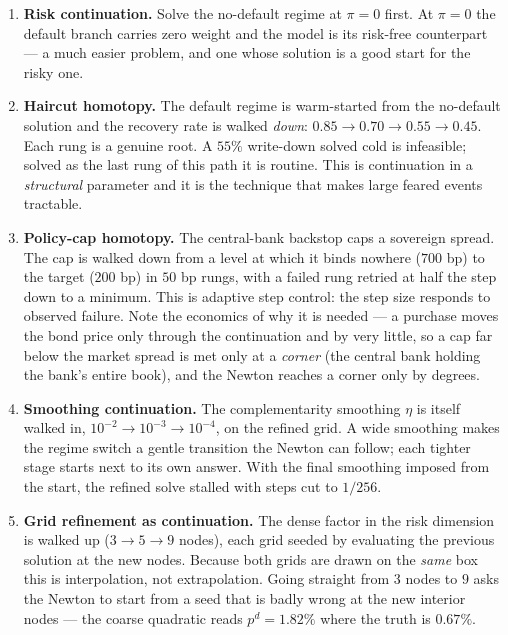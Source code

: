 \documentclass[10pt,a4paper]{article}
\theoremstyle{definition}
\theoremstyle{plain}
\theoremstyle{remark}
\begin{document}
\begin{enumerate}
\item \textbf{Risk continuation.} Solve the no-default regime at $\pi = 0$ first. At $\pi=0$
the default branch carries zero weight and the model is its risk-free counterpart --- a much
easier problem, and one whose solution is a good start for the risky one.

\item \textbf{Haircut homotopy.} The default regime is warm-started from the no-default
solution and the recovery rate is walked \emph{down}:
$0.85 \to 0.70 \to 0.55 \to 0.45$. Each rung is a genuine root. A $55\%$ write-down solved
cold is infeasible; solved as the last rung of this path it is routine. This is continuation in
a \emph{structural} parameter and it is the technique that makes large feared events tractable.

\item \textbf{Policy-cap homotopy.} The central-bank backstop caps a sovereign spread. The
cap is walked down from a level at which it binds nowhere ($700$ bp) to the target ($200$ bp)
in $50$ bp rungs, with a failed rung retried at half the step down to a minimum. This is
adaptive step control: the step size responds to observed failure. Note the economics of why
it is needed --- a purchase moves the bond price only through the continuation and by very
little, so a cap far below the market spread is met only at a \emph{corner} (the central bank
holding the bank's entire book), and the Newton reaches a corner only by degrees.

\item \textbf{Smoothing continuation.} The complementarity smoothing $\eta$ is itself walked
in, $10^{-2}\to10^{-3}\to10^{-4}$, on the refined grid. A wide smoothing makes the regime
switch a gentle transition the Newton can follow; each tighter stage starts next to its own
answer. With the final smoothing imposed from the start, the refined solve stalled with steps
cut to $1/256$.

\item \textbf{Grid refinement as continuation.} The dense factor in the risk dimension is
walked up ($3\to5\to9$ nodes), each grid seeded by evaluating the previous solution at the new
nodes. Because both grids are drawn on the \emph{same} box this is interpolation, not
extrapolation. Going straight from $3$ nodes to $9$ asks the Newton to start from a seed that
is badly wrong at the new interior nodes --- the coarse quadratic reads $p^d = 1.82\%$ where
the truth is $0.67\%$.
\end{enumerate}
\end{document}
